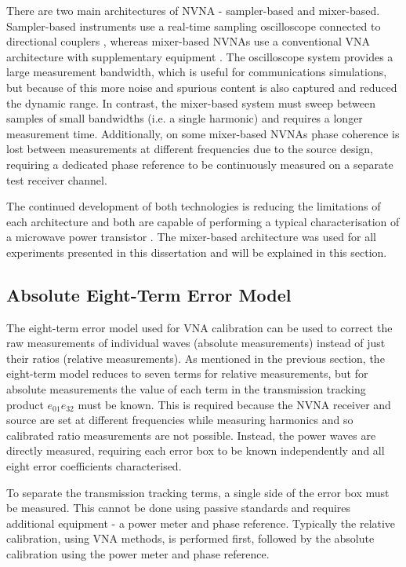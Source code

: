 \documentclass[../thesis/thesis.tex]{subfiles}
\begin{document}
\begin{refsection}
There are two main architectures of NVNA - sampler-based and mixer-based. Sampler-based instruments use a real-time sampling oscilloscope connected to directional couplers \cite{Sipila_1988, Broeck_1994, Scott_2002, VanMoer_2006}, whereas mixer-based NVNAs use a conventional VNA architecture with supplementary equipment \cite{Lott_1989, Blockley_2005}. The oscilloscope system provides a large measurement bandwidth, which is useful for communications simulations, but because of this more noise and spurious content is also captured and reduced the dynamic range. In contrast, the mixer-based system must sweep between samples of small bandwidths (i.e. a single harmonic) and requires a longer measurement time. Additionally, on some mixer-based NVNAs phase coherence is lost between measurements at different frequencies due to the source design, requiring a dedicated phase reference to be continuously measured on a separate test receiver channel.

The continued development of both technologies is reducing the limitations of each architecture and both are capable of performing a typical characterisation of a microwave power transistor \cite{Casbon_2015}. The mixer-based architecture was used for all experiments presented in this dissertation and will be explained in this section.

\subsection{Absolute Eight-Term Error Model}

The eight-term error model used for VNA calibration can be used to correct the raw measurements of individual waves (absolute measurements) instead of just their ratios (relative measurements). As mentioned in the previous section, the eight-term model reduces to seven terms for relative measurements, but for absolute measurements the value of each term in the transmission tracking product $e_{01}e_{32}$ must be known. This is required because the NVNA receiver and source are set at different frequencies while measuring harmonics and so calibrated ratio measurements are not possible. Instead, the power waves are directly measured, requiring each error box to be known independently and all eight error coefficients characterised.

To separate the transmission tracking terms, a single side of the error box must be measured. This cannot be done using passive standards and requires additional equipment - a power meter and phase reference. Typically the relative calibration, using VNA methods, is performed first, followed by the absolute calibration using the power meter and phase reference.


\end{refsection}
\end{document}
